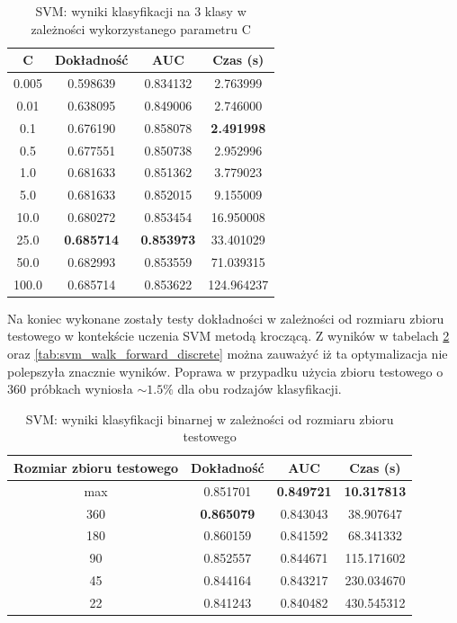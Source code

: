 \documentclass[a4paper, twoside, 11pt, openright]{article}
\begin{document}
\begin{table}[H]
    \centering
    \begin{tabular}{|c|c|c|c|}
    \hline
        \textbf{C} & \textbf{Dokładność} & \textbf{AUC} & \textbf{Czas (s)} \\ \hline
0.005 &  0.598639 &  0.834132 &    2.763999 \\ \hline
0.01  &  0.638095 &  0.849006 &    2.746000 \\ \hline
0.1   &  0.676190 &  0.858078 &    \textbf{2.491998} \\ \hline
0.5   &  0.677551 &  0.850738 &    2.952996 \\ \hline
1.0   &  0.681633 &  0.851362 &    3.779023 \\ \hline
5.0   &  0.681633 &  0.852015 &    9.155009 \\ \hline
10.0  &  0.680272 &  0.853454 &   16.950008 \\ \hline
25.0  &  \textbf{0.685714} &  \textbf{0.853973} &   33.401029 \\ \hline
50.0  & 0.682993  &  0.853559 &  71.039315  \\ \hline
100.0  &  0.685714 &  0.853622 &  124.964237 \\ \hline
    \end{tabular}
    \caption{SVM: wyniki klasyfikacji na 3 klasy w zależności wykorzystanego parametru C}
    \label{tab:svm_c_discrete}
\end{table}


Na koniec wykonane zostały testy dokładności w zależności od rozmiaru zbioru testowego w kontekście uczenia SVM metodą kroczącą. Z wyników w tabelach \ref{tab:svm_walk_forward_binary} oraz \ref{tab:svm_walk_forward_discrete} można zauważyć iż ta optymalizacja nie polepszyła znacznie wyników. Poprawa w przypadku użycia zbioru testowego o 360 próbkach wyniosła $\sim 1.5\%$ dla obu rodzajów klasyfikacji.


\begin{table}[H]
    \centering
    \begin{tabular}{|c|c|c|c|}
    \hline
        \textbf{Rozmiar zbioru testowego} & \textbf{Dokładność} & \textbf{AUC} & \textbf{Czas (s)} \\ \hline
max                        &  0.851701 &  \textbf{0.849721} &   \textbf{10.317813} \\ \hline
360                         &  \textbf{0.865079} &  0.843043 &   38.907647 \\ \hline
180                        &  0.860159 &  0.841592 &   68.341332 \\ \hline
90                          &  0.852557 &  0.844671 &  115.171602 \\ \hline
45                          &  0.844164 &  0.843217 &  230.034670 \\ \hline
22                          &  0.841243 &  0.840482 &  430.545312 \\ \hline
    \end{tabular}
    \caption{SVM: wyniki klasyfikacji binarnej w zależności od rozmiaru zbioru testowego}
    \label{tab:svm_walk_forward_binary}
\end{table}
\end{document}
